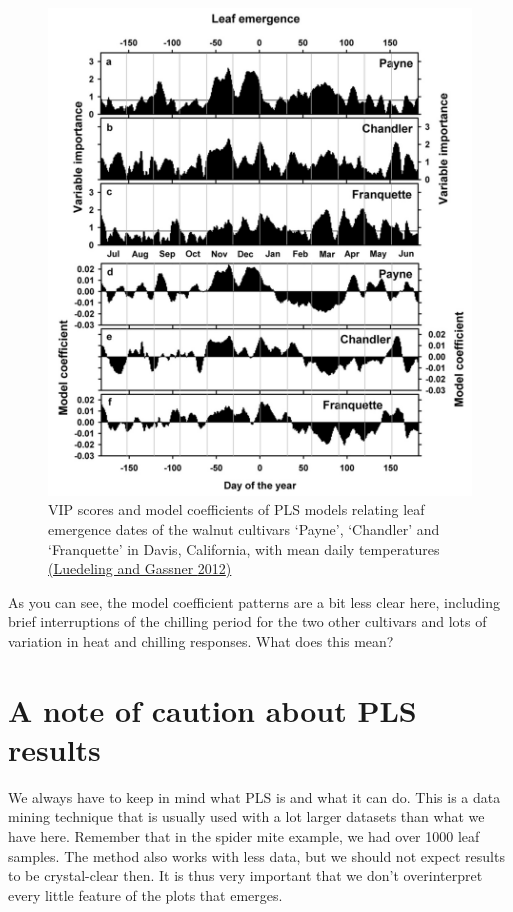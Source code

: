 \documentclass[
]{book}
\begin{document}
\begin{figure}
\centering
\includegraphics{pictures/PLS_walnuts.png}
\caption{VIP scores and model coefficients of PLS models relating leaf emergence dates of the walnut cultivars `Payne', `Chandler' and `Franquette' in Davis, California, with mean daily temperatures \href{https://www.sciencedirect.com/science/article/abs/pii/S0168192312000561}{(Luedeling and Gassner \protect\hyperlink{ref-luedeling2012partial}{2012})}}
\end{figure}

As you can see, the model coefficient patterns are a bit less clear here, including brief interruptions of the chilling period for the two other cultivars and lots of variation in heat and chilling responses. What does this mean?

\hypertarget{a-note-of-caution-about-pls-results}{%
\section{A note of caution about PLS results}\label{a-note-of-caution-about-pls-results}}

We always have to keep in mind what PLS is and what it can do. This is a data mining technique that is usually used with a lot larger datasets than what we have here. Remember that in the spider mite example, we had over 1000 leaf samples. The method also works with less data, but we should not expect results to be crystal-clear then. It is thus very important that we don't overinterpret every little feature of the plots that emerges.
\end{document}
